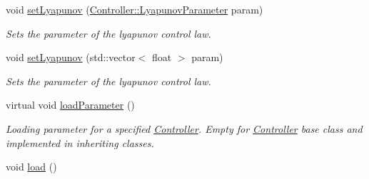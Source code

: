 \begin{DoxyCompactItemize}
void \hyperlink{classController_abda96416fab439c188ef494a2b2a0c8e}{set\+Lyapunov} (\hyperlink{structController_1_1LyapunovParameter}{Controller\+::\+Lyapunov\+Parameter} param)
\begin{DoxyCompactList}\small\item\em Sets the parameter of the lyapunov control law. \end{DoxyCompactList}\item 
void \hyperlink{classController_a1f77caed7a7951ca2f4cf7928f88669d}{set\+Lyapunov} (std\+::vector$<$ float $>$ param)
\begin{DoxyCompactList}\small\item\em Sets the parameter of the lyapunov control law. \end{DoxyCompactList}\item 
virtual void \hyperlink{classController_a59e60885d5307979faf477435507069a}{load\+Parameter} ()\hypertarget{classController_a59e60885d5307979faf477435507069a}{}\label{classController_a59e60885d5307979faf477435507069a}

\begin{DoxyCompactList}\small\item\em Loading parameter for a specified \hyperlink{classController}{Controller}. Empty for \hyperlink{classController}{Controller} base class and implemented in inheriting classes. \end{DoxyCompactList}\item 
void \hyperlink{classController_a55c77d2e41634c9b21543647f74eec4c}{load} ()\hypertarget{classController_a55c77d2e41634c9b21543647f74eec4c}{}\label{classController_a55c77d2e41634c9b21543647f74eec4c}


\end{DoxyCompactItemize}

